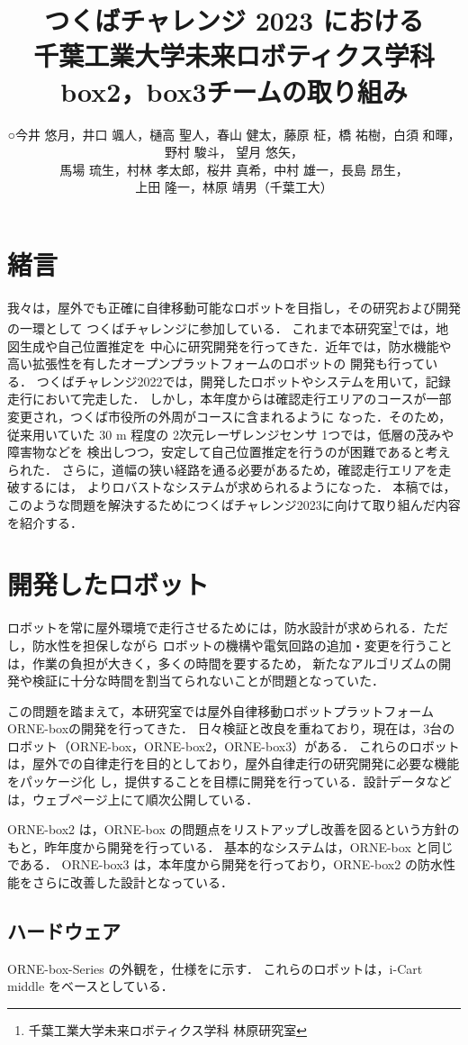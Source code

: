 \documentclass[twocolumn, 9pt]{jsproceedings}
\title{つくばチャレンジ 2023 における\\千葉工業大学未来ロボティクス学科 box2，box3チームの取り組み}
\author{○今井 悠月，井口 颯人，樋高 聖人，春山 健太，藤原 柾，\CID{8705}橋 祐樹，白須 和暉，野村 駿斗，
望月 悠矢，\\馬場 琉生，村林 孝太郎，桜井 真希，中村 雄一，長島 昂生，\\上田 隆一，林原 靖男（千葉工大）}
\affiliation{千葉工業大学未来ロボティクス学科 box2, box3チーム}
\begin{document}
\maketitle

\section{緒言}
我々は，屋外でも正確に自律移動可能なロボットを目指し，その研究および開発の一環として
つくばチャレンジに参加している．
これまで本研究室\footnote{千葉工業大学未来ロボティクス学科 林原研究室}では，地図生成や自己位置推定を
中心に研究開発を行ってきた．近年では，防水機能や高い拡張性を有したオープンプラットフォームのロボットの
開発も行っている．
つくばチャレンジ2022では，開発したロボットやシステムを用いて，記録走行において完走した．
しかし，本年度からは確認走行エリアのコースが一部変更され，つくば市役所の外周がコースに含まれるように
なった．そのため，従来用いていた 30 m 程度の 2次元レーザレンジセンサ 1つでは，低層の茂みや障害物などを
検出しつつ，安定して自己位置推定を行うのが困難であると考えられた．
さらに，道幅の狭い経路を通る必要があるため，確認走行エリアを走破するには，
よりロバストなシステムが求められるようになった．
本稿では，このような問題を解決するためにつくばチャレンジ2023に向けて取り組んだ内容を紹介する．

\section{開発したロボット}
ロボットを常に屋外環境で走行させるためには，防水設計が求められる．ただし，防水性を担保しながら
ロボットの機構や電気回路の追加・変更を行うことは，作業の負担が大きく，多くの時間を要するため，
新たなアルゴリズムの開発や検証に十分な時間を割当てられないことが問題となっていた．

この問題を踏まえて，本研究室では屋外自律移動ロボットプラットフォーム ORNE-boxの開発を行ってきた\cite{box}．
日々検証と改良を重ねており，現在は，3台のロボット（ORNE-box，ORNE-box2，ORNE-box3）がある．
これらのロボットは，屋外での自律走行を目的としており，屋外自律走行の研究開発に必要な機能をパッケージ化
し，提供することを目標に開発を行っている．設計データなどは，ウェブページ上にて順次公開している\cite{box-data}．

ORNE-box2 は，ORNE-box の問題点をリストアップし改善を図るという方針のもと，昨年度から開発を行っている．
基本的なシステムは，ORNE-box と同じである．
ORNE-box3 は，本年度から開発を行っており，ORNE-box2 の防水性能をさらに改善した設計となっている．

\subsection{ハードウェア}
ORNE-box-Series の外観を，仕様をに示す．
これらのロボットは，i-Cart middle\cite{icart} をベースとしている．
\end{document}
